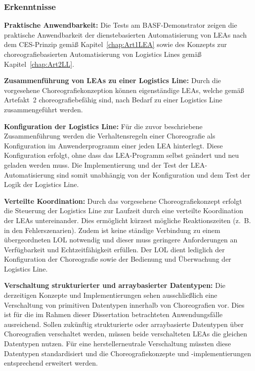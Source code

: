 \subsubsection{Erkenntnisse}

\textbf{Praktische Anwendbarkeit:} Die Tests am BASF-Demonstrator zeigen die praktische Anwendbarkeit der dienstebasierten Automatisierung von LEAs nach dem CES-Prinzip gemäß Kapitel~\ref{chap:Art1LEA} sowie des Konzepts zur choreografiebasierten Automatisierung von Logistics Lines gemäß Kapitel~\ref{chap:Art2LL}. 

\textbf{Zusammenführung von LEAs zu einer Logistics Line:} Durch die vorgesehene Choreografiekonzeption können eigenständige LEAs, welche gemäß Artefakt~2 choreografiebefähig sind, nach Bedarf zu einer Logistics Line zusammengeführt werden.

\textbf{Konfiguration der Logistics Line:} Für die zuvor beschriebene Zusammenführung werden die Verhaltensregeln einer Choreografie als Konfiguration im Anwenderprogramm einer jeden LEA hinterlegt. Diese Konfiguration erfolgt, ohne dass das LEA-Programm selbst geändert und neu geladen werden muss. Die Implementierung und der Test der LEA-Automatisierung sind somit unabhängig von der Konfiguration und dem Test der Logik der Logistics Line. 

\textbf{Verteilte Koordination:} Durch das vorgesehene Choreografiekonzept erfolgt die Steuerung der Logistics Line zur Laufzeit durch eine verteilte Koordination der LEAs untereinander. Dies ermöglicht kürzest mögliche Reaktionszeiten (z.~B. in den Fehlerszenarien). Zudem ist keine ständige Verbindung zu einem übergeordneten LOL notwendig und dieser muss geringere Anforderungen an Verfügbarkeit und Echtzeitfähigkeit erfüllen. Der LOL dient lediglich der Konfiguration der Choreografie sowie der Bedienung und Überwachung der Logistics Line.

\textbf{Verschaltung strukturierter und arraybasierter Datentypen:} Die derzeitigen Konzepte und Implementierungen sehen ausschließlich eine Verschaltung von primitiven Datentypen innerhalb von Choreografien vor. Dies ist für die im Rahmen dieser Dissertation betrachteten Anwendungsfälle ausreichend. Sollen zukünftig strukturierte oder arraybasierte Datentypen über Choreografien verschaltet werden, müssen beide verschalteten LEAs die gleichen Datentypen nutzen. Für eine herstellerneutrale Verschaltung müssten diese Datentypen standardisiert und die Choreografiekonzepte und -implementierungen entsprechend erweitert werden.

